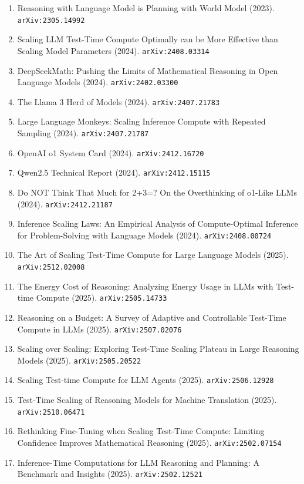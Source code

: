 \documentclass[11pt]{article}
\begin{document}
\begin{enumerate}
  Model (2023). \texttt{arXiv:2305.18290}
  \item Reasoning with Language Model is Planning with World Model (2023). \texttt{arXiv:2305.14992}
  \item Scaling LLM Test-Time Compute Optimally can be More Effective than
  Scaling Model Parameters (2024). \texttt{arXiv:2408.03314}
  \item DeepSeekMath: Pushing the Limits of Mathematical Reasoning in Open
  Language Models (2024). \texttt{arXiv:2402.03300}
  \item The Llama 3 Herd of Models (2024). \texttt{arXiv:2407.21783}
  \item Large Language Monkeys: Scaling Inference Compute with Repeated Sampling (2024). \texttt{arXiv:2407.21787}
  \item OpenAI o1 System Card (2024). \texttt{arXiv:2412.16720}
  \item Qwen2.5 Technical Report (2024). \texttt{arXiv:2412.15115}
  \item Do NOT Think That Much for 2+3=? On the Overthinking of o1-Like LLMs (2024). \texttt{arXiv:2412.21187}
  \item Inference Scaling Laws: An Empirical Analysis of Compute-Optimal
  Inference for Problem-Solving with Language Models (2024). \texttt{arXiv:2408.00724}
  \item The Art of Scaling Test-Time Compute for Large Language Models (2025). \texttt{arXiv:2512.02008}
  \item The Energy Cost of Reasoning: Analyzing Energy Usage in LLMs with Test-time Compute (2025). \texttt{arXiv:2505.14733}
  \item Reasoning on a Budget: A Survey of Adaptive and Controllable Test-Time Compute in LLMs (2025). \texttt{arXiv:2507.02076}
  \item Scaling over Scaling: Exploring Test-Time Scaling Plateau in Large Reasoning Models (2025). \texttt{arXiv:2505.20522}
  \item Scaling Test-time Compute for LLM Agents (2025). \texttt{arXiv:2506.12928}
  \item Test-Time Scaling of Reasoning Models for Machine Translation (2025). \texttt{arXiv:2510.06471}
  \item Rethinking Fine-Tuning when Scaling Test-Time Compute: Limiting Confidence Improves Mathematical Reasoning (2025). \texttt{arXiv:2502.07154}
  \item Inference-Time Computations for LLM Reasoning and Planning: A Benchmark
  and Insights (2025). \texttt{arXiv:2502.12521}

\end{enumerate}
\end{document}
